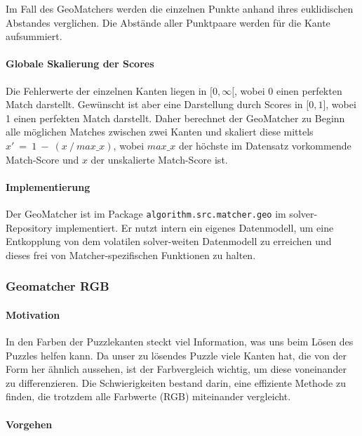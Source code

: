 Im Fall des GeoMatchers werden die einzelnen Punkte anhand ihres
euklidischen Abstandes verglichen. Die Abstände aller Punktpaare werden
für die Kante aufsummiert.

\paragraph{Globale Skalierung der Scores}

Die Fehlerwerte der einzelnen Kanten liegen in ${[}0, \infty{[}$, wobei 0
einen perfekten Match darstellt. Gewünscht ist aber eine Darstellung
durch Scores in ${[}0, 1{]}$, wobei 1 einen perfekten Match darstellt.
Daher berechnet der GeoMatcher zu Beginn alle möglichen Matches zwischen
zwei Kanten und skaliert diese mittels $x'\ =\ 1\ -\ (x\ /\ max\_x)$, 
wobei $max\_x$ der höchste im Datensatz vorkommende Match-Score und $x$ der unskalierte
Match-Score ist.

\paragraph{Implementierung}

Der GeoMatcher ist im Package \texttt{algorithm.src.matcher.geo} im solver-Repository 
implementiert. Er nutzt intern ein eigenes Datenmodell, um eine Entkopplung von dem 
volatilen solver-weiten Datenmodell zu erreichen und dieses frei von Matcher-spezifischen
Funktionen zu halten.

\subsubsection[Geomatcher RGB]{Geomatcher RGB  }

\paragraph{Motivation}
In den Farben der Puzzlekanten steckt viel Information, was uns beim Lösen des Puzzles helfen kann. Da unser zu lösendes Puzzle viele Kanten hat, die von der Form her ähnlich aussehen, ist der Farbvergleich wichtig, um diese voneinander zu differenzieren. Die Schwierigkeiten bestand darin, eine effiziente Methode zu finden, die trotzdem alle Farbwerte (RGB) miteinander vergleicht.

\paragraph{Vorgehen}


